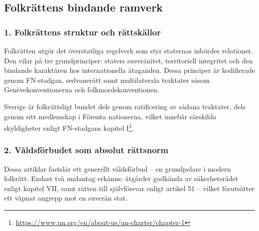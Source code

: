 %
%


\subsection{Folkrättens bindande ramverk}
\label{subsec:folkrattens_bindande_ramverk}

\subsubsection*{1. Folkrättens struktur och rättskällor}

Folkrätten utgör det överstatliga regelverk som styr staternas inbördes relationer. 
Den vilar på tre grundprinciper: staters suveränitet, territoriell integritet och den 
bindande karaktären hos internationella åtaganden. Dessa principer är kodifierade genom FN-stadgan, 
sedvanerätt samt multilaterala traktater såsom Genèvekonventionerna och folkmordskonventionen.

Sverige är folkrättsligt bundet dels genom ratificering av sådana traktater, dels genom sitt 
medlemskap i Förenta nationerna, vilket innebär särskilda skyldigheter enligt FN-stadgans kapitel I\footnote{\url{https://www.un.org/en/about-us/un-charter/chapter-1}}.

\subsubsection*{2. Våldsförbudet som absolut rättsnorm}


Dessa artiklar fastslår ett generellt våldsförbud – en grundpelare i modern folkrätt. 
Endast två undantag erkänns: åtgärder godkända av säkerhetsrådet enligt kapitel VII, samt 
rätten till självförsvar enligt artikel 51 – vilket förutsätter ett väpnat angrepp mot en suverän stat.

